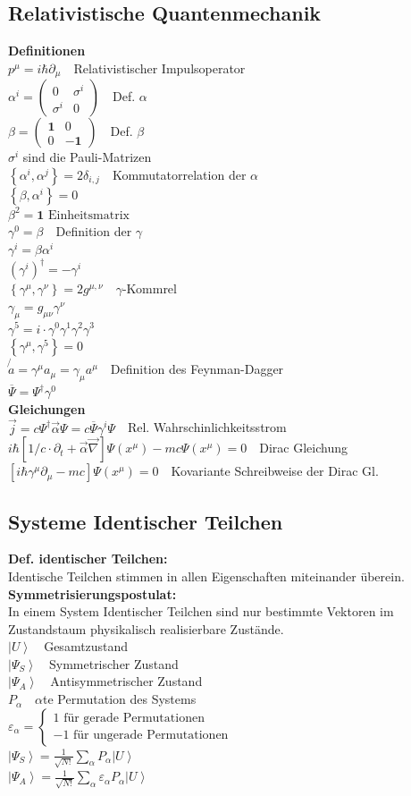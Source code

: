 \documentclass[8pt,a4paper]{extarticle}
\newcommand{\frml}[2]{$#1$~\hfill~#2\\}
\newcommand{\ket}[1]{\left|#1\right\rangle}
\begin{document}
\begin{multicols}{3}
\subsection{Relativistische Quantenmechanik}
\textbf{Definitionen}\\
\frml{p^\mu = i\hbar \partial_\mu}{Relativistischer Impulsoperator}
\frml{\alpha^i = \begin{pmatrix} 0 & \sigma^i \\ \sigma^i & 0 \end{pmatrix}}{Def. $\alpha$}
\frml{\beta = \begin{pmatrix} \mathbf{1} & 0 \\ 0 & -\mathbf{1} \end{pmatrix}}{Def. $\beta$}
$\sigma^i$ sind die Pauli-Matrizen \\
\frml{\left\{\alpha^i,\alpha^j\right\} = 2\delta_{i,j}}{Kommutatorrelation der $\alpha$}
\frml{\left\{\beta, \alpha^i\right\} = 0}{}
\frml{\beta^2 = \mathbf{1} \text{  Einheitsmatrix}}{}
\frml{\gamma^0 = \beta}{Definition der $\gamma$}
\frml{\gamma^i = \beta\alpha^i}{}
\frml{(\gamma^i)^\dagger = -\gamma^i}{}
\frml{\left\{\gamma^\mu,\gamma^\nu \right\} = 2g^{\mu,\nu}}{$\gamma$-Kommrel}
\frml{\gamma_\mu = g_{\mu\nu}\gamma^\nu}{}
\frml{\gamma^5 = i\cdot \gamma^0\gamma^1\gamma^2\gamma^3}{}
\frml{\left\{\gamma^\mu, \gamma^5\right\} = 0}{}
\frml{\not{a} = \gamma^\mu a_\mu = \gamma_\mu a^\mu}{Definition des Feynman-Dagger}
\frml{\overline{\Psi} = \Psi^\dagger \gamma^0}{}
\textbf{Gleichungen}\\
\frml{\vec{j} = c \Psi^\dagger \vec{\alpha} \Psi = c \overline{\Psi} \gamma^i \Psi}{Rel. Wahrschinlichkeitsstrom}
\frml{i\hbar\left[ 1/c \cdot \partial_t + \vec{\alpha}\vec{\nabla}\right] \Psi(x^\mu) - mc\Psi(x^\mu) = 0}{Dirac Gleichung}
\frml{\left[i\hbar \gamma^\mu \partial_\mu -mc\right]\Psi(x^\mu)=0}{Kovariante Schreibweise der Dirac Gl.}
\subsection{Systeme Identischer Teilchen}
\textbf{Def. identischer Teilchen:}\\
Identische Teilchen stimmen in allen Eigenschaften miteinander \"uberein.\\
\textbf{Symmetrisierungspostulat:}\\
In einem System Identischer Teilchen sind nur bestimmte Vektoren im Zustandstaum physikalisch realisierbare Zust\"ande.\\
\frml{\ket{U}}{Gesamtzustand}
\frml{\ket{\Psi_S}}{Symmetrischer Zustand}
\frml{\ket{\Psi_A}}{Antisymmetrischer Zustand}
\frml{P_\alpha}{$\alpha$te Permutation des Systems}
\frml{\varepsilon_\alpha = \begin{cases} 1 \text{ f\"ur gerade Permutationen} \\ -1 \text{ f\"ur ungerade Permutationen} \end{cases}}{}
\frml{\ket{\Psi_S} = \frac{1}{\sqrt{N!}} \sum_\alpha P_\alpha \ket{U}}{}
\frml{\ket{\Psi_A} = \frac{1}{\sqrt{N!}} \sum_\alpha \varepsilon_\alpha P_\alpha \ket{U}}{}


\end{multicols}
\end{document}
